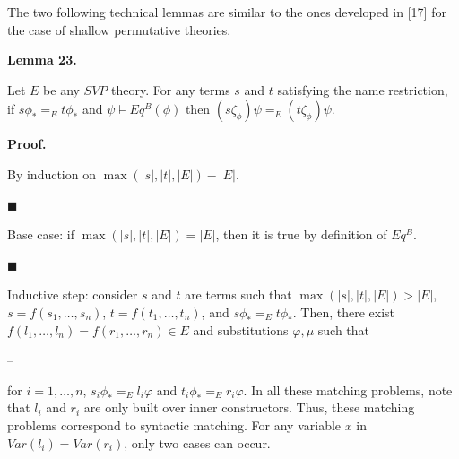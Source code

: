 \documentclass[10pt,a4paper]{amsart}
\begin{document}
 
 
 
The two following technical lemmas are similar to the ones developed in [17] for the case of shallow permutative theories.\par
 
 
 
\par\medskip\noindent\textbf{Lemma 23.}\par
 
 
Let $E$ be any $\mathit{SVP}$ theory. For any terms $s$ and $t$ satisfying the name restriction, if $s\phi_{*}=_{E}t\phi_{*}$ and $\psi\models Eq^{B}(\phi)$ then $(s\zeta_{\phi})\psi=_{E}(t\zeta_{\phi})\psi$.\par
 
 
 
 
\par\medskip\noindent\textbf{Proof.}\par
 
 
By induction on $\max(|s|,|t|,|E|)-|E|$.\par
  
\par\noindent  $\blacksquare$ 
 
Base case: if $\max(|s|,|t|,|E|)=|E|$, then it is true by definition of $Eq^{B}$.\par
 
 
 
\par\noindent  $\blacksquare$ 
 
Inductive step: consider $s$ and $t$ are terms such that $\max(|s|,|t|,|E|)>|E|$, $s=f(s_{1},\dots,s_{n})$, $t=f(t_{1},\dots,t_{n})$, and $s\phi_{*}=_{E}t\phi_{*}$. Then, there exist $f(l_{1},\dots,l_{n})=f(r_{1},\dots,r_{n})\in E$ and substitutions $\varphi,\mu$ such that\par
  
\par\noindent  – 
 
for $i=1,\dots,n$, $s_{i}\phi_{*}=_{E}l_{i}\varphi$ and $t_{i}\phi_{*}=_{E}r_{i}\varphi$. In all these matching problems, note that $l_{i}$ and $r_{i}$ are only built over inner constructors. Thus, these matching problems correspond to syntactic matching. For any variable $x$ in $\mathit{Var}(l_{i})=\mathit{Var}(r_{i})$, only two cases can occur.\par
 
\end{document}
